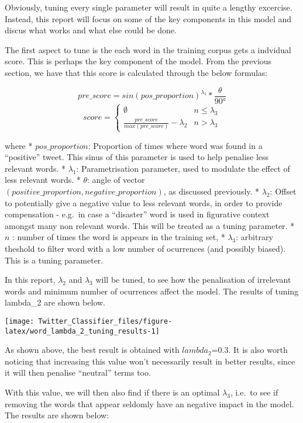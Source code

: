 \documentclass[11pt,]{article}
\begin{document}
Obviously, tuning every single parameter will result in quite a lengthy
excercise. Instead, this report will focus on some of the key components
in this model and discus what works and what else could be done.

The first aspect to tune is the each word in the training corpus gets a
indvidual score. This is perhaps the key component of the model. From
the previous section, we have that this score is calculated through the
below formulas:

\[pre\_score = sin(pos\_proportion)^{\lambda_1}*\frac{\theta}{90 \si{\degree} }\]
\[score = 
 \begin{cases} 
      \emptyset & n \leq \lambda_3 \\
      \frac{pre\_score}{max(pre\_score)} - \lambda_2 & n > \lambda_3
   \end{cases}\]

where * \(pos\_proportion\): Proportion of times where word was found in
a ``positive'' tweet. This sinus of this parameter is used to help
penalise less relevant words. * \(\lambda_1\): Parametrisation
parameter, used to modulate the effect of less relevant words. *
\(\theta\): angle of vector
\((positive\_proportion,negative\_proportion)\), as discussed
previously. * \(\lambda_2\): Offset to potentially give a negative value
to less relevant words, in order to provide compensation - e.g.~in case
a ``disaster'' word is used in figurative context amongst many non
relevant words. This will be treated as a tuning parameter. * \(n\) :
number of times the word is appears in the training set, *
\(\lambda_3\): arbitrary theshold to filter word with a low number of
ocurrences (and possibly biased). This is a tuning parameter.

In this report, \(\lambda_2\) and \(\lambda_3\) will be tuned, to see
how the penalisation of irrelevant words and minimum number of
ocurrences affect the model. The results of tuning lambda\_2 are shown
below.

\begin{center}\texttt{[image: Twitter\_Classifier\_files/figure-latex/word\_lambda\_2\_tuning\_results-1]} \end{center}

As shown above, the best result is obtained with \(lambda_2\)=0.3. It is
also worth noticing that increasing this value won't necessarily result
in better results, since it will then penalise ``neutral'' terms too.

With this value, we will then also find if there is an optimal
\(\lambda_3\), i.e.~to see if removing the words that appear seldomly
have an negative impact in the model. The results are shown below:
\end{document}
